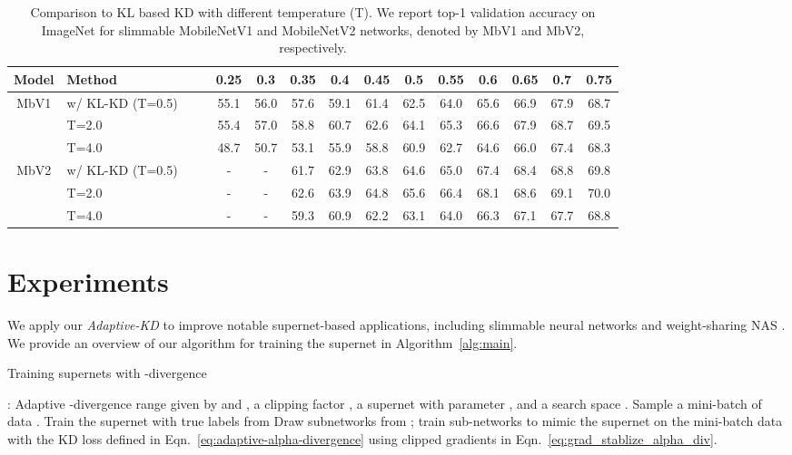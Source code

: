 \documentclass{article}
\begin{document}
\begin{table*}[ht]
\centering
\setlength{\tabcolsep}{4pt}
\begin{tabular}{c|l|ccccccccccc}
\hline
Model & Method & 0.25 &  0.3  &  0.35  &  0.4  &  0.45  &  0.5  &  0.55   &  0.6  & 0.65 & 0.7 & 0.75\\
\hline \hline 
\multirow{3}{*}{MbV1} & w/ KL-KD (T=0.5)~~~~
& 55.1  & 56.0 & 57.6& 59.1  & 61.4 & 62.5  & 64.0 & 65.6  & 66.9  & 67.9  & 68.7  \\
& T=2.0 & 55.4& 57.0 & 58.8 & 60.7 & 62.6 & 64.1& 65.3 & 66.6  & 67.9 & 68.7& 69.5\\
&  T=4.0 & 48.7  & 50.7  & 53.1 & 55.9  & 58.8 & 60.9& 62.7 & 64.6 & 66.0 & 67.4 & 68.3\\
\hline \hline 
\multirow{3}{*}{MbV2} & w/ KL-KD (T=0.5)~~~& - & - &  61.7 & 62.9 & 63.8 & 64.6 & 65.0 & 67.4 & 68.4 & 68.8 & 69.8  \\
 & T=2.0 & - & - & 62.6 & 63.9 & 64.8 & 65.6 & 66.4 & 68.1 & 68.6 & 69.1 & 70.0 \\ 
 & T=4.0 & - & - & 59.3 & 60.9 & 62.2 & 63.1 & 64.0 & 66.3 & 67.1 & 67.7 & 68.8 \\ \hline 
\end{tabular}
\caption{Comparison to KL based KD with different temperature (T).  
We report top-1 validation accuracy on ImageNet for slimmable MobileNetV1 and MobileNetV2  networks, denoted by MbV1 and MbV2, respectively.}
\label{tab:slimmable_abalation}
\end{table*}

\section{Experiments}
We apply our \emph{Adaptive-KD} to improve notable supernet-based applications, including  slimmable neural networks \citep{yu2019universally}
and weight-sharing NAS  \citep[e.g.,][]{cai2019once, yu2020bignas, wang2020attentivenas}. 
We provide an overview of our algorithm for training the supernet in Algorithm~\ref{alg:main}.

\begin{algorithm}[t]
\caption{Training supernets with -divergence}
\label{alg:main}
\begin{algorithmic}[1]
: Adaptive -divergence range given by  and , a clipping factor , a supernet with parameter , and a search space .
\STATE Sample a mini-batch of data .
\STATE Train the supernet with true labels from 
\STATE Draw  subnetworks  from ; train sub-networks to mimic the supernet on the mini-batch data  with the KD loss defined in Eqn.~\eqref{eq:adaptive-alpha-divergence} using clipped gradients in Eqn.~\eqref{eq:grad_stablize_alpha_div}.
\ENDWHILE
\end{algorithmic}
\end{algorithm}
\end{document}
